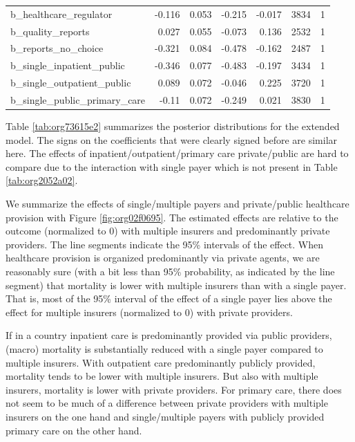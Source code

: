 \documentclass{article}
\begin{document}
\begin{table}[htbp]
\begin{tabular}{lrrrrrr}
b\_healthcare\_regulator & -0.116 & 0.053 & -0.215 & -0.017 & 3834 & 1\\
b\_quality\_reports & 0.027 & 0.055 & -0.073 & 0.136 & 2532 & 1\\
b\_reports\_no\_choice & -0.321 & 0.084 & -0.478 & -0.162 & 2487 & 1\\
b\_single\_inpatient\_public & -0.346 & 0.077 & -0.483 & -0.197 & 3434 & 1\\
b\_single\_outpatient\_public & 0.089 & 0.072 & -0.046 & 0.225 & 3720 & 1\\
b\_single\_public\_primary\_care & -0.11 & 0.072 & -0.249 & 0.021 & 3830 & 1\\
\end{tabular}
\end{table}


Table \ref{tab:org73615e2} summarizes the posterior distributions for the extended model. The signs on the coefficients that were clearly signed before are similar here. The effects of inpatient/outpatient/primary care private/public are hard to compare due to the interaction with single payer which is not present in Table \ref{tab:org2052a02}.

We summarize the effects of single/multiple payers and private/public healthcare provision with Figure \ref{fig:org02f0695}. The estimated effects are relative to the outcome (normalized to 0) with multiple insurers and predominantly private providers. The line segments indicate the 95\% intervals of the effect. When healthcare provision is organized predominantly via private agents, we are reasonably sure (with a bit less than 95\% probability, as indicated by the line segment) that mortality is lower with multiple insurers than with a single payer. That is, most of the 95\% interval of the effect of a single payer lies above the effect for multiple insurers (normalized to 0) with private providers.

If in a country inpatient care is predominantly provided via public providers, (macro) mortality is substantially reduced with a single payer compared to multiple insurers. With outpatient care predominantly publicly provided, mortality tends to be lower with multiple insurers. But also with multiple insurers, mortality is lower with private providers. For primary care, there does not seem to be much of a difference between private providers with multiple insurers on the one hand and single/multiple payers with publicly provided primary care on the other hand.
\end{document}

